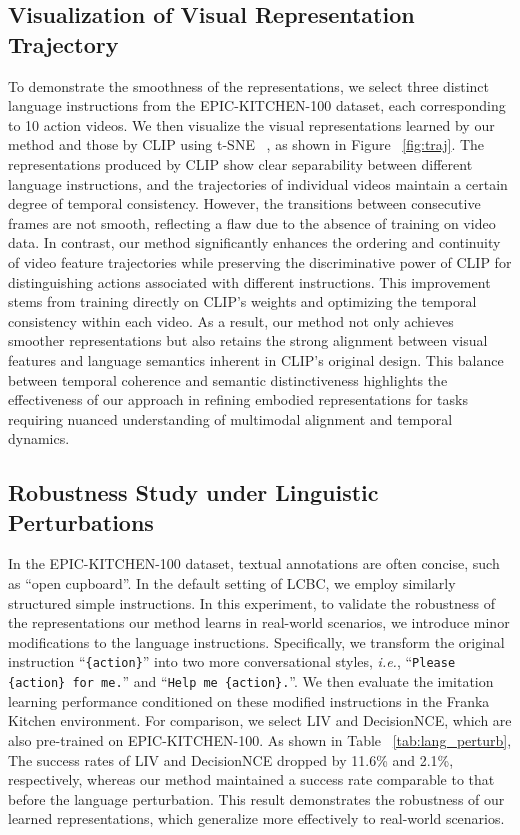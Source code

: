 \subsection{Visualization of Visual Representation Trajectory}
To demonstrate the smoothness of the representations, we select three distinct language instructions from the EPIC-KITCHEN-100 dataset, each corresponding to 10 action videos. We then visualize the visual representations learned by our method and those by CLIP using t-SNE ~\cite{tsne}, as shown in Figure ~\ref{fig:traj}. The representations produced by CLIP show clear separability between different language instructions, and the trajectories of individual videos maintain a certain degree of temporal consistency. However, the transitions between consecutive frames are not smooth, reflecting a flaw due to the absence of training on video data.
In contrast, our method significantly enhances the ordering and continuity of video feature trajectories while preserving the discriminative power of CLIP for distinguishing actions associated with different instructions. This improvement stems from training directly on CLIP's weights and optimizing the temporal consistency within each video. As a result, our method not only achieves smoother representations but also retains the strong alignment between visual features and language semantics inherent in CLIP's original design. This balance between temporal coherence and semantic distinctiveness highlights the effectiveness of our approach in refining embodied representations for tasks requiring nuanced understanding of multimodal alignment and temporal dynamics. 

\subsection{Robustness Study under Linguistic Perturbations} \label{sec:robustness}
In the EPIC-KITCHEN-100 dataset, textual annotations are often concise, such as ``open cupboard''. In the default setting of LCBC, we employ similarly structured simple instructions. In this experiment, to validate the robustness of the representations our method learns in real-world scenarios, we introduce minor modifications to the language instructions. Specifically, we transform the original instruction ``\texttt{\{action\}}'' into two more conversational styles, \textit{i.e.}, ``\texttt{Please \{action\} for me.}'' and ``\texttt{Help me \{action\}.}''. We then evaluate the imitation learning performance conditioned on these modified instructions in the Franka Kitchen environment. For comparison, we select LIV and DecisionNCE, which are also pre-trained on EPIC-KITCHEN-100. As shown in Table ~\ref{tab:lang_perturb}, The success rates of LIV and DecisionNCE dropped by 11.6\% and 2.1\%, respectively, whereas our method maintained a success rate comparable to that before the language perturbation. This result demonstrates the robustness of our learned representations, which generalize more effectively to real-world scenarios.


